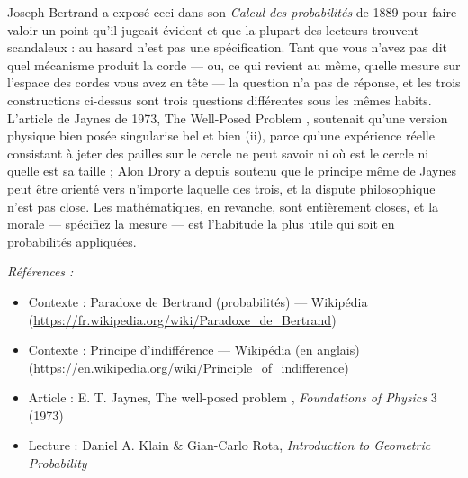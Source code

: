 \documentclass[11pt]{article}
\newenvironment{refs}{\par\small\noindent\emph{Références :}\begin{itemize}\setlength\itemsep{0pt}}{\end{itemize}\normalsize}
\begin{document}
\noindent Joseph Bertrand a exposé ceci dans son \textit{Calcul des probabilités} de
1889 pour faire valoir un point qu'il jugeait évident et que la plupart des lecteurs trouvent
scandaleux : \og{} au hasard \fg{} n'est pas une spécification. Tant que vous n'avez pas dit quel
mécanisme produit la corde --- ou, ce qui revient au même, quelle mesure sur l'espace des
cordes vous avez en tête --- la question n'a pas de réponse, et les trois constructions
ci-dessus sont trois questions différentes sous les mêmes habits. L'article de Jaynes de
1973, \og{} The Well-Posed Problem \fg{}, soutenait qu'une version physique bien posée singularise
bel et bien (ii), parce qu'une expérience réelle consistant à jeter des pailles sur le cercle
ne peut savoir ni où est le cercle ni quelle est sa taille ; Alon Drory a depuis soutenu que
le principe même de Jaynes peut être orienté vers n'importe laquelle des trois, et la dispute
philosophique n'est pas close. Les mathématiques, en revanche, sont entièrement closes, et
la morale --- spécifiez la mesure --- est l'habitude la plus utile qui soit en probabilités
appliquées.

\begin{refs}
\item Contexte : Paradoxe de Bertrand (probabilités) --- Wikipédia (\url{https://fr.wikipedia.org/wiki/Paradoxe_de_Bertrand})
\item Contexte : Principe d'indifférence --- Wikipédia (en anglais) (\url{https://en.wikipedia.org/wiki/Principle_of_indifference})
\item Article : E. T. Jaynes, \og{} The well-posed problem \fg{}, \textit{Foundations of Physics} 3 (1973)
\item Lecture : Daniel A. Klain \& Gian-Carlo Rota, \textit{Introduction to Geometric Probability}
\end{refs}

\bigskip
\end{document}

